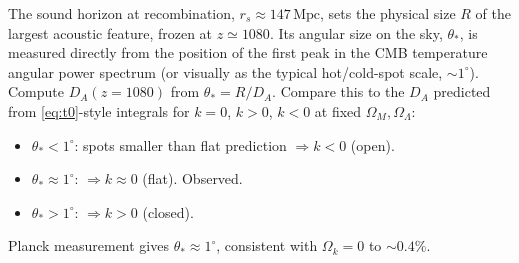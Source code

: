 \documentclass[11pt]{article}
\begin{document}
The sound horizon at recombination, $r_s\approx 147\,\text{Mpc}$, sets the physical size $R$ of the largest acoustic feature, frozen at $z\simeq 1080$. Its angular size on the sky, $\theta_*$, is measured directly from the position of the first peak in the CMB temperature angular power spectrum (or visually as the typical hot/cold-spot scale, $\sim 1^\circ$). Compute $D_A(z=1080)$ from $\theta_*=R/D_A$. Compare this to the $D_A$ predicted from \eqref{eq:t0}-style integrals for $k=0$, $k>0$, $k<0$ at fixed $\Omega_M,\Omega_\Lambda$:
\begin{itemize}
\item $\theta_*<1^\circ$: spots smaller than flat prediction $\Rightarrow k<0$ (open).
\item $\theta_*\approx 1^\circ$: $\Rightarrow k\approx 0$ (flat). Observed.
\item $\theta_*>1^\circ$: $\Rightarrow k>0$ (closed).
\end{itemize}
Planck measurement gives $\theta_*\approx 1^\circ$, consistent with $\Omega_k=0$ to $\sim 0.4\%$.
\end{document}
